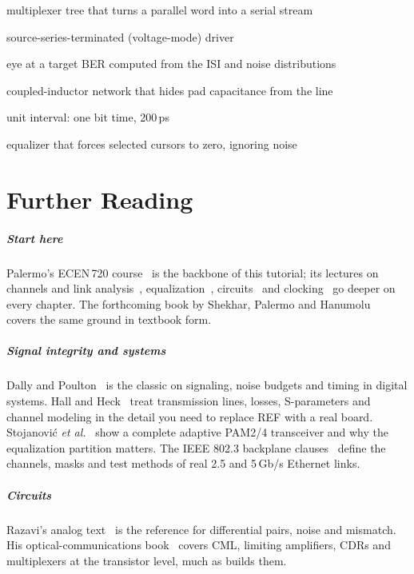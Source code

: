 {\begin{description}[leftmargin=31mm,labelwidth=29mm,labelsep=2mm,itemsep=0.05em,parsep=0pt,topsep=0pt,font=\sffamily\bfseries\color{navy}]
  \item[Serializer] multiplexer tree that turns a parallel word into a serial stream
  \item[SST driver] source-series-terminated (voltage-mode) driver
  \item[Statistical eye] eye at a target BER computed from the ISI and noise distributions
  \item[T-coil] coupled-inductor network that hides pad capacitance from the line
  \item[UI] unit interval: one bit time, 200\,ps
  \item[Zero-forcing] equalizer that forces selected cursors to zero, ignoring noise
\end{description}
}

\chapter{Further Reading}\label{app:reading}

\paragraph{Start here} Palermo's ECEN\,720 course~\cite{palermo720} is the backbone of this tutorial; its lectures on channels and link analysis~\cite{palermo720ch}, equalization~\cite{palermo720eq}, circuits~\cite{palermo720ckt} and clocking~\cite{palermo720clk} go deeper on every chapter. The forthcoming book by Shekhar, Palermo and Hanumolu~\cite{shekhar2026} covers the same ground in textbook form.

\paragraph{Signal integrity and systems} Dally and Poulton~\cite{dally1998} is the classic on signaling, noise budgets and timing in digital systems. Hall and Heck~\cite{hall2009} treat transmission lines, losses, S-parameters and channel modeling in the detail you need to replace REF with a real board. Stojanovi\'c \emph{et al.}~\cite{stojanovic2005} show a complete adaptive PAM2/4 transceiver and why the equalization partition matters. The IEEE 802.3 backplane clauses~\cite{ieee8023} define the channels, masks and test methods of real 2.5 and 5\,Gb/s Ethernet links.

\paragraph{Circuits} Razavi's analog text~\cite{razaviAnalog} is the reference for differential pairs, noise and mismatch. His optical-communications book~\cite{razaviOptical} covers CML, limiting amplifiers, CDRs and multiplexers at the transistor level, much as \OS{} builds them.


